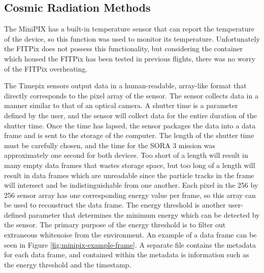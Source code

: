 \subsection{Cosmic Radiation Methods}
\label{sec:Cosmic-Radiation-Methods}

The MiniPIX has a built-in temperature sensor that can report the temperature of the device, so this function was used to monitor its temperature.
Unfortunately the FITPix does not possess this functionality, but considering the container which housed the FITPix has been tested in previous flights, there was no worry of the FITPix overheating.

The Timepix sensors output data in a human-readable, array-like format that directly corresponds to the pixel array of the sensor.
The sensor collects data in a manner similar to that of an optical camera.
A shutter time is a parameter defined by the user, and the sensor will collect data for the entire duration of the shutter time.
Once the time has lapsed, the sensor packages the data into a data frame and is sent to the storage of the computer.
The length of the shutter time must be carefully chosen, and the time for the SORA 3 mission was approximately one second for both devices.
Too short of a length will result in many empty data frames that wastes storage space, but too long of a length will result in data frames which are unreadable since the particle tracks in the frame will intersect and be indistinguishable from one another.
Each pixel in the 256 by 256 sensor array has one corresponding energy value per frame, so this array can be used to reconstruct the data frame.
The energy threshold is another user-defined parameter that determines the minimum energy which can be detected by the sensor.
The primary purpose of the energy threshold is to filter out extraneous whitenoise from the environment.
An example of a data frame can be seen in Figure \ref{fig:minipix-example-frame}.
A separate file contains the metadata for each data frame, and contained within the metadata is information such as the energy threshold and the timestamp.

